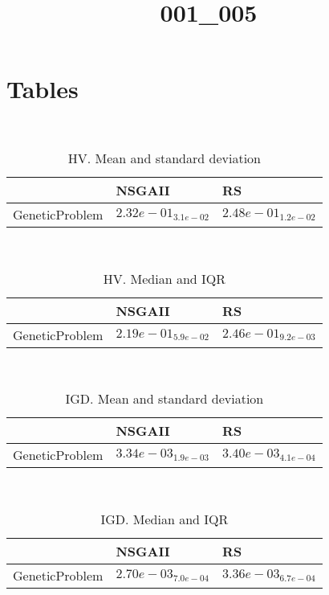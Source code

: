 \documentclass{article}
\title{001_005}
\author{}
\begin{document}
\maketitle
\section{Tables}
\
\begin{table}
\caption{HV. Mean and standard deviation}
\label{table:mean.HV}
\centering
\begin{scriptsize}
\begin{tabular}{lll}
\hline & NSGAII &  RS\\
\hline
GeneticProblem & \cellcolor{gray25}$  2.32e-01_{ 3.1e-02}$ & \cellcolor{gray95}$  2.48e-01_{ 1.2e-02}$ \\
\hline
\end{tabular}
\end{scriptsize}
\end{table}
\
\begin{table}
\caption{HV. Median and IQR}
\label{table:median.HV}
\begin{scriptsize}
\centering
\begin{tabular}{lll}
\hline & NSGAII &  RS\\
\hline
GeneticProblem & \cellcolor{gray25}$  2.19e-01_{ 5.9e-02}$ & \cellcolor{gray95}$  2.46e-01_{ 9.2e-03}$ \\
\hline
\end{tabular}
\end{scriptsize}
\end{table}
\
\begin{table}
\caption{IGD. Mean and standard deviation}
\label{table:mean.IGD}
\centering
\begin{scriptsize}
\begin{tabular}{lll}
\hline & NSGAII &  RS\\
\hline
GeneticProblem & \cellcolor{gray95}$  3.34e-03_{ 1.9e-03}$ & $  3.40e-03_{ 4.1e-04}$ \\
\hline
\end{tabular}
\end{scriptsize}
\end{table}
\
\begin{table}
\caption{IGD. Median and IQR}
\label{table:median.IGD}
\begin{scriptsize}
\centering
\begin{tabular}{lll}
\hline & NSGAII &  RS\\
\hline
GeneticProblem & \cellcolor{gray95}$  2.70e-03_{ 7.0e-04}$ & $  3.36e-03_{ 6.7e-04}$ \\
\hline
\end{tabular}
\end{scriptsize}
\end{table}
\end{document}
